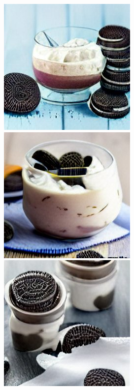 
\begin{figure}
	\centering
	\includegraphics[width=.25\textwidth]{lasse/oreo_curd.jpg}\hspace{3mm}
	\includegraphics[width=.25\textwidth]{lasse/oreo_curd1.jpg}\hspace{3mm}
	\includegraphics[width=.25\textwidth]{lasse/oreo_curd2.jpg}\hspace{3mm}
\end{figure}
    



